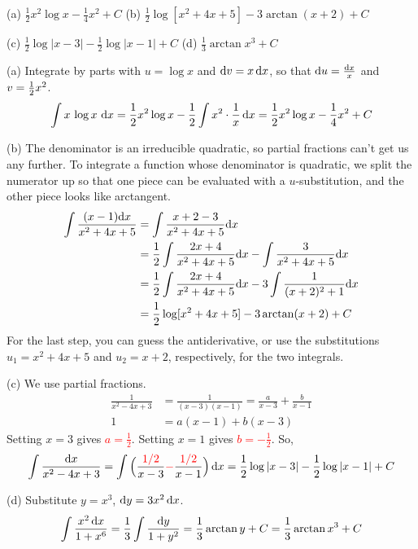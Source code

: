 \begin{answer} (a)
$\displaystyle\frac12 x^2\log x -\frac{1}{4} x^2+C$
\qquad (b)
$\displaystyle\frac{1}{2} \log [x^2+4x+5] -3\arctan(x+2)+C$

\noindent (c)
$\displaystyle\frac12\log|x-3|-\frac12\log|x-1|+C$
\qquad (d)
$\displaystyle\frac{1}{3}\arctan x^3 +C$
\end{answer}

\begin{solution} (a)
Integrate by parts with $u=\log x$ and $\mathrm{d}v=x\,\mathrm{d}x$,
so that $\mathrm{d}u=\frac{\mathrm{d}x}{x}$ and $v=\tfrac{1}{2} x^2$.
\begin{align*}
\int x\,\log x\ \mathrm{d}x= \frac{1}{2} x^2\log x- \frac{1}{2} \int x^2\cdot\frac{1}{x}\,\mathrm{d}x
=\frac{1}{2} x^2\log x -\frac{1}{4} x^2+C
\end{align*}

\noindent (b)   The denominator is an irreducible quadratic, so partial fractions can't get us any further. To integrate a function whose denominator is quadratic, we split the numerator up so that one piece can be evaluated with a $u$-substitution, and the other piece looks like arctangent.
\begin{align*}
\int\frac{(x-1)\mathrm{d}x}{x^2+4x+5}
&=\int\frac{x+2-3}{x^2+4x+5}\mathrm{d}x
\\
&=\frac{1}{2}\int\frac{2x+4}{x^2+4x+5}\mathrm{d}x
-\int\frac{3}{x^2+4x+5}\mathrm{d}x
\\
&=\frac{1}{2}\int\frac{2x+4}{x^2+4x+5}\mathrm{d}x-3\int\frac{1}{(x+2)^2+1}\mathrm{d}x
\\
&=\frac{1}{2} \log [x^2+4x+5] -3\arctan(x+2)+C
\end{align*}
For the last step, you can guess the antiderivative, or use the substitutions $u_1=x^2+4x+5$ and $u_2=x+2$, respectively, for the two integrals.

\noindent (c) We use partial fractions.
\begin{align*}
\frac{1}{x^2-4x+3}
&=\frac{1}{(x-3)(x-1)}
=\frac{a}{x-3}+\frac{b}{x-1}\\
1&=a(x-1)+b(x-3)
\end{align*}
Setting $x=3$ gives \textcolor{red}{$a=\frac{1}{2}$}.
Setting $x=1$ gives \textcolor{red}{$b=-\frac{1}{2}$}.  So,
\begin{align*}
\int\frac{\mathrm{d}x}{x^2-4x+3}
=\int\Big(\frac{\textcolor{red}{1/2}}{x-3}\textcolor{red}{-}\frac{\textcolor{red}{1/2}}{x-1}\Big)\,\mathrm{d}x
=\frac{1}{2}\log|x-3|-\frac{1}{2}\log|x-1|+C
\end{align*}

\noindent (d) Substitute $y=x^3$, $\mathrm{d}y=3x^2\,\mathrm{d}x$.
\begin{align*}
\int\frac{x^2\,\mathrm{d}x}{1+x^6}= \frac{1}{3} \int \frac{\mathrm{d}y}{1+y^2}
= \frac{1}{3}\arctan y+C
=\frac{1}{3}\arctan x^3 +C
\end{align*}

\end{solution}

